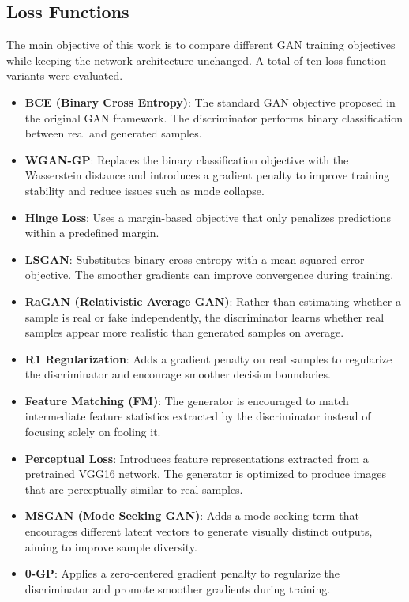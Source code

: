 \documentclass[conference]{IEEEtran}
\begin{document}
\subsection{Loss Functions}

The main objective of this work is to compare different GAN
training objectives while keeping the network architecture
unchanged. A total of ten loss function variants were evaluated.

\begin{itemize}

\item \textbf{BCE (Binary Cross Entropy)}:
The standard GAN objective proposed in the original GAN
framework. The discriminator performs binary classification
between real and generated samples.

\item \textbf{WGAN-GP}:
Replaces the binary classification objective with the Wasserstein
distance and introduces a gradient penalty to improve training
stability and reduce issues such as mode collapse.

\item \textbf{Hinge Loss}:
Uses a margin-based objective that only penalizes predictions
within a predefined margin.

\item \textbf{LSGAN}:
Substitutes binary cross-entropy with a mean squared error
objective. The smoother gradients can improve convergence
during training.

\item \textbf{RaGAN (Relativistic Average GAN)}:
Rather than estimating whether a sample is real or fake
independently, the discriminator learns whether real samples
appear more realistic than generated samples on average.

\item \textbf{R1 Regularization}:
Adds a gradient penalty on real samples to regularize the
discriminator and encourage smoother decision boundaries.

\item \textbf{Feature Matching (FM)}:
The generator is encouraged to match intermediate feature
statistics extracted by the discriminator instead of focusing
solely on fooling it.

\item \textbf{Perceptual Loss}:
Introduces feature representations extracted from a pretrained
VGG16 network. The generator is optimized to produce images
that are perceptually similar to real samples.

\item \textbf{MSGAN (Mode Seeking GAN)}:
Adds a mode-seeking term that encourages different latent
vectors to generate visually distinct outputs, aiming to improve
sample diversity.

\item \textbf{0-GP}:
Applies a zero-centered gradient penalty to regularize the
discriminator and promote smoother gradients during training.

\end{itemize}
\end{document}
